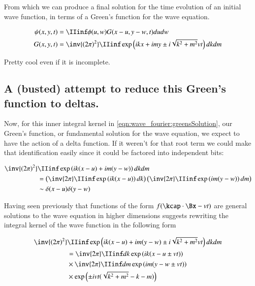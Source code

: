 From which we can produce a final solution for the time evolution of an initial wave function, in terms of a Green's function
for the wave equation.

\begin{align}\label{eqn:wave_fourier:greensSolution}
{\psi}(x,y,t) &= \IIinf \phi(u,w) G( x-u, y-w, t) du dw \\
G(x,y,t) &= \inv{({2\pi})^2} \IIinf \exp\left( i k x + i m y \pm i \sqrt{k^2 + m^2} v t \right) dk dm
\end{align}

Pretty cool even if it is incomplete.

\subsection{A (busted) attempt to reduce this Green's function to deltas. }

Now, for this inner integral kernel in \ref{eqn:wave_fourier:greensSolution}, our Green's function, or fundamental solution for the wave equation,
we expect to have the action of a delta function.  If it weren't for that root term we could make that
identification easily since it could be factored into independent bits:

\begin{align*}
\inv{({2\pi})^2} &\IIinf \exp\left( i k (x-u) + i m (y-w) \right) dk dm  \\
&=
\left(\inv{{2\pi}} \IIinf \exp\left( i k (x-u) \right) dk \right)
\left(\inv{{2\pi}} \IIinf \exp\left( i m (y-w) \right) dm \right) \\
&\sim \delta( x - u)\delta( y - w)
\end{align*}

Having seen previously that functions of the form $f(\kcap \cdot \Bx -v t)$ are general solutions to the wave equation in higher 
dimensions suggests rewriting the integral kernel of the wave function in the following form

\begin{align*}
\inv{({2\pi})^2} &\IIinf \exp\left( i k (x-u) + i m (y-w) \pm i \sqrt{k^2 + m^2} v t \right) dk dm \\
&=
\inv{{2\pi}} \IIinf dk \exp\left( i k (x - u \pm v t) \right) \\
&\times \inv{{2\pi}} \IIinf dm \exp\left( i m (y - w \pm v t) \right) \\
&\times \exp\left( \pm i v t ( \sqrt{k^2 + m^2} -k - m ) \right) \\
\end{align*}

